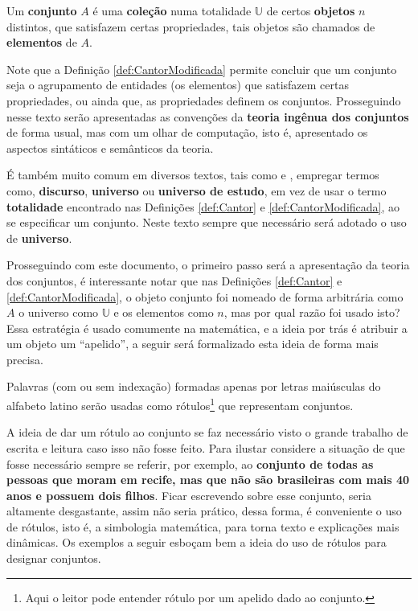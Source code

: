 \begin{definicao}\label{def:CantorModificada}
  Um \textbf{conjunto} $A$ é uma \textbf{coleção} numa totalidade $\mathbb{U}$ de certos \textbf{objetos} $n$ distintos, que satisfazem certas propriedades, tais objetos são chamados de \textbf{elementos} de $A$.
\end{definicao}

Note que a Definição \ref{def:CantorModificada} permite concluir que um conjunto seja o agrupamento de entidades (os elementos) que satisfazem certas propriedades, ou ainda que, as propriedades definem os conjuntos. Prosseguindo nesse texto serão apresentadas as convenções da \textbf{teoria ingênua dos conjuntos} de forma usual, mas com um olhar de computação, isto é, apresentado os aspectos sintáticos e semânticos da teoria. 

\begin{atencao}[Nomenclatura.]\label{note:NomeclaturaDiscurso}
  É também muito comum em diversos textos, tais como \cite{carmo2013} e \cite{lipschutz1978-TC}, empregar termos como, {\bf discurso}, {\bf universo} ou {\bf universo de estudo}, em vez de usar o termo {\bf totalidade} encontrado nas Definições \ref{def:Cantor} e \ref{def:CantorModificada}, ao se especificar um conjunto. Neste texto sempre que necessário será adotado o uso de {\bf universo}.
\end{atencao}

Prosseguindo com este documento, o primeiro passo será a apresentação da teoria dos conjuntos, é interessante notar que nas Definições \ref{def:Cantor} e \ref{def:CantorModificada}, o objeto conjunto foi nomeado de forma arbitrária como $A$ o universo como $\mathbb{U}$ e os elementos como $n$, mas por qual razão foi usado isto? Essa estratégia é usado comumente na matemática, e a ideia por trás é atribuir a um objeto um ``apelido'', a seguir será formalizado esta ideia de forma mais precisa.

\begin{definicao}\label{def:RotuloConjunto}
	Palavras (com ou sem indexação) formadas apenas por letras maiúsculas do alfabeto latino serão usadas como rótulos\footnote{Aqui o leitor pode entender rótulo por um apelido dado ao conjunto.} que representam conjuntos.
\end{definicao}

A ideia de dar um rótulo ao conjunto se faz necessário visto o grande trabalho de escrita e leitura caso isso não fosse feito. Para ilustar considere a situação de que fosse necessário sempre se referir, por exemplo, ao \textbf{conjunto de todas as pessoas que moram em recife, mas que não são brasileiras com mais 40 anos e possuem dois filhos}. Ficar escrevendo sobre esse conjunto, seria altamente desgastante, assim não seria prático, dessa forma, é conveniente o uso de rótulos, isto é, a simbologia matemática, para torna texto e explicações mais dinâmicas. Os exemplos a seguir esboçam bem a ideia do uso de rótulos para designar conjuntos.

